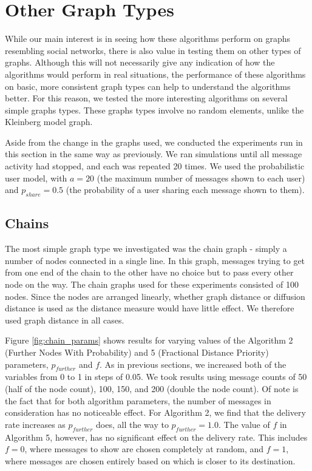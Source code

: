 \documentclass[bsc,frontabs,twoside,singlespacing,parskip,deptreport]{infthesis}     %
\begin{document}
\section{Other Graph Types} \label{sec:other_graph_types}

While our main interest is in seeing how these algorithms perform on graphs resembling social networks, there is also value in testing them on other types of graphs. Although this will not necessarily give any indication of how the algorithms would perform in real situations, the performance of these algorithms on basic, more consistent graph types can help to understand the algorithms better. For this reason, we tested the more interesting algorithms on several simple graphs types. These graphs types involve no random elements, unlike the Kleinberg model graph.

Aside from the change in the graphs used, we conducted the experiments run in this section in the same way as previously. We ran simulations until all message activity had stopped, and each was repeated 20 times. We used the probabilistic user model, with $a=20$ (the maximum number of messages shown to each user) and $p_{share}=0.5$ (the probability of a user sharing each message shown to them).

\subsection{Chains}
The most simple graph type we investigated was the chain graph - simply a number of nodes connected in a single line. In this graph, messages trying to get from one end of the chain to the other have no choice but to pass every other node on the way. The chain graphs used for these experiments consisted of 100 nodes. Since the nodes are arranged linearly, whether graph distance or diffusion distance is used as the distance measure would have little effect. We therefore used graph distance in all cases.

Figure \ref{fig:chain_params} shows results for varying values of the Algorithm 2 (Further Nodes With Probability) and 5 (Fractional Distance Priority) parameters, $p_{further}$ and $f$. As in previous sections, we increased both of the variables from 0 to 1 in steps of 0.05. We took results using message counts of 50 (half of the node count), 100, 150, and 200 (double the node count). Of note is the fact that for both algorithm parameters, the number of messages in consideration has no noticeable effect. For Algorithm 2, we find that the delivery rate increases as $p_{further}$ does, all the way to $p_{further}=1.0$. The value of $f$ in Algorithm 5, however, has no significant effect on the delivery rate. This includes $f=0$, where messages to show are chosen completely at random, and $f=1$, where messages are chosen entirely based on which is closer to its destination.
\end{document}
